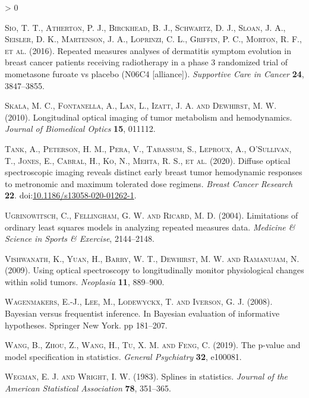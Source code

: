 \documentclass[
]{article}
\newlength{\cslhangindent}
\newenvironment{CSLReferences}[2] %
 {%
  \setlength{\parindent}{0pt}
  \ifodd #1 \everypar{\setlength{\hangindent}{\cslhangindent}}\ignorespaces\fi
  \ifnum #2 > 0
  \setlength{\parskip}{#2\baselineskip}
  \fi
 }%
 {}
\begin{document}
\begin{CSLReferences}{1}{0}
\leavevmode\hypertarget{ref-sio2016}{}%
\textsc{Sio, T. T., Atherton, P. J., Birckhead, B. J., Schwartz, D. J., Sloan, J. A., Seisler, D. K., Martenson, J. A., Loprinzi, C. L., Griffin, P. C., Morton, R. F., et al.} (2016). Repeated measures analyses of dermatitis symptom evolution in breast cancer patients receiving radiotherapy in a phase 3 randomized trial of mometasone furoate vs placebo (N06C4 {[}alliance{]}). \emph{Supportive Care in Cancer} \textbf{24}, 3847--3855.

\leavevmode\hypertarget{ref-skala2010}{}%
\textsc{Skala, M. C., Fontanella, A., Lan, L., Izatt, J. A. and Dewhirst, M. W.} (2010). Longitudinal optical imaging of tumor metabolism and hemodynamics. \emph{Journal of Biomedical Optics} \textbf{15}, 011112.

\leavevmode\hypertarget{ref-tank2020}{}%
\textsc{Tank, A., Peterson, H. M., Pera, V., Tabassum, S., Leproux, A., O'Sullivan, T., Jones, E., Cabral, H., Ko, N., Mehta, R. S., et al.} (2020). Diffuse optical spectroscopic imaging reveals distinct early breast tumor hemodynamic responses to metronomic and maximum tolerated dose regimens. \emph{Breast Cancer Research} \textbf{22}. doi:\href{https://doi.org/10.1186/s13058-020-01262-1}{10.1186/s13058-020-01262-1}.

\leavevmode\hypertarget{ref-ugrinowitsch2004}{}%
\textsc{Ugrinowitsch, C., Fellingham, G. W. and Ricard, M. D.} (2004). Limitations of ordinary least squares models in analyzing repeated measures data. \emph{Medicine {\&} Science in Sports {\&} Exercise}, 2144--2148.

\leavevmode\hypertarget{ref-vishwanath2009}{}%
\textsc{Vishwanath, K., Yuan, H., Barry, W. T., Dewhirst, M. W. and Ramanujam, N.} (2009). Using optical spectroscopy to longitudinally monitor physiological changes within solid tumors. \emph{Neoplasia} \textbf{11}, 889--900.

\leavevmode\hypertarget{ref-wagenmakers2008}{}%
\textsc{Wagenmakers, E.-J., Lee, M., Lodewyckx, T. and Iverson, G. J.} (2008). Bayesian versus frequentist inference. In Bayesian evaluation of informative hypotheses. Springer New York. pp 181--207.

\leavevmode\hypertarget{ref-wang2019}{}%
\textsc{Wang, B., Zhou, Z., Wang, H., Tu, X. M. and Feng, C.} (2019). The p-value and model specification in statistics. \emph{General Psychiatry} \textbf{32}, e100081.

\leavevmode\hypertarget{ref-wegman1983}{}%
\textsc{Wegman, E. J. and Wright, I. W.} (1983). Splines in statistics. \emph{Journal of the American Statistical Association} \textbf{78}, 351--365.


\end{CSLReferences}
\end{document}
